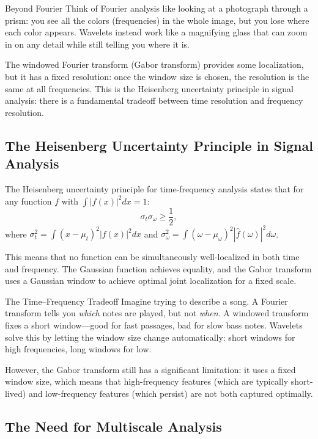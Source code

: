 \begin{knowledgebridge}{Beyond Fourier}
Think of Fourier analysis like looking at a photograph through a prism:
you see all the colors (frequencies) in the whole image, but you
lose where each color appears. Wavelets instead work like a magnifying
glass that can zoom in on any detail while still telling you where it is.
\end{knowledgebridge}

The windowed Fourier transform (Gabor transform) provides some localization, but it has a fixed resolution: once the window size is chosen, the resolution is the same at all frequencies. This is the Heisenberg uncertainty principle in signal analysis: there is a fundamental tradeoff between time resolution and frequency resolution.

\subsection{The Heisenberg Uncertainty Principle in Signal Analysis}

The Heisenberg uncertainty principle for time-frequency analysis states that for any function $f$ with $\int |f(x)|^2 dx = 1$:
\[
\sigma_t \sigma_\omega \geq \frac{1}{2},
\]
where $\sigma_t^2 = \int (x - \mu_t)^2 |f(x)|^2 dx$ and $\sigma_\omega^2 = \int (\omega - \mu_\omega)^2 |\hat f(\omega)|^2 d\omega$.

This means that no function can be simultaneously well-localized in both time and frequency. The Gaussian function achieves equality, and the Gabor transform uses a Gaussian window to achieve optimal joint localization for a fixed scale.

\begin{primer}{The Time--Frequency Tradeoff}
Imagine trying to describe a song. A Fourier transform tells you
\emph{which} notes are played, but not \emph{when}. A windowed
transform fixes a short window---good for fast passages, bad for slow
bass notes. Wavelets solve this by letting the window size change
automatically: short windows for high frequencies, long windows for low.
\end{primer}

However, the Gabor transform still has a significant limitation: it uses a fixed window size, which means that high-frequency features (which are typically short-lived) and low-frequency features (which persist) are not both captured optimally.

\subsection{The Need for Multiscale Analysis}

